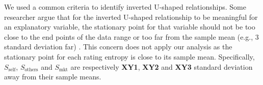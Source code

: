 \documentclass[msom,blindrev]{informs3}
\begin{document}
We used a common criteria to identify inverted U-shaped relationships.  Some researcher argue that for the inverted U-shaped relationship to be meaningful for an explanatory variable, the stationary point for that variable should not be too close to the end points of the data range or too far from the sample mean (e.g., 3 standard deviation far) \cite{lind2010or}. This concern does not apply our analysis as the stationary point for each rating entropy is close to its sample mean. Specifically, $S_{\text{self}}$, $S_{\text{others}}$ and $S_{\text{mkt}}$ are respectively \textbf{XY1}, \textbf{XY2} and  \textbf{XY3} standard deviation away from their sample means.






%


%
%
\end{document}
